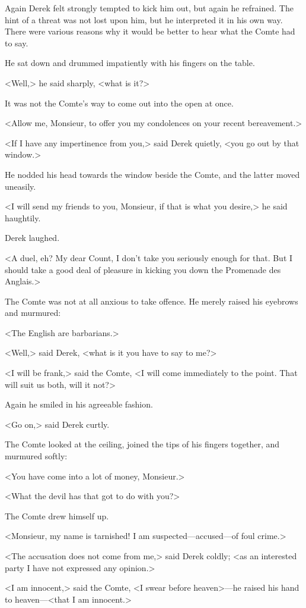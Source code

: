 Again Derek felt strongly tempted to kick him out, but again he refrained. The hint of a threat was not lost upon him, but he interpreted it in his own way. There were various reasons why it would be better to hear what the Comte had to say.

He sat down and drummed impatiently with his fingers on the table.

<Well,> he said sharply, <what is it?>

It was not the Comte's way to come out into the open at once.

<Allow me, Monsieur, to offer you my condolences on your recent bereavement.>

<If I have any impertinence from you,> said Derek quietly, <you go out by that window.>

He nodded his head towards the window beside the Comte, and the latter moved uneasily.

<I will send my friends to you, Monsieur, if that is what you desire,> he said haughtily.

Derek laughed.

<A duel, eh? My dear Count, I don't take you seriously enough for that. But I should take a good deal of pleasure in kicking you down the Promenade des Anglais.>

The Comte was not at all anxious to take offence. He merely raised his eyebrows and murmured:

<The English are barbarians.>

<Well,> said Derek, <what is it you have to say to me?>

<I will be frank,> said the Comte, <I will come immediately to the point. That will suit us both, will it not?>

Again he smiled in his agreeable fashion.

<Go on,> said Derek curtly.

The Comte looked at the ceiling, joined the tips of his fingers together, and murmured softly:

<You have come into a lot of money, Monsieur.>

<What the devil has that got to do with you?>

The Comte drew himself up.

<Monsieur, my name is tarnished! I am suspected—accused—of foul crime.>

<The accusation does not come from me,> said Derek coldly; <as an interested party I have not expressed any opinion.>

<I am innocent,> said the Comte, <I swear before heaven>—he raised his hand to heaven—<that I am innocent.>

